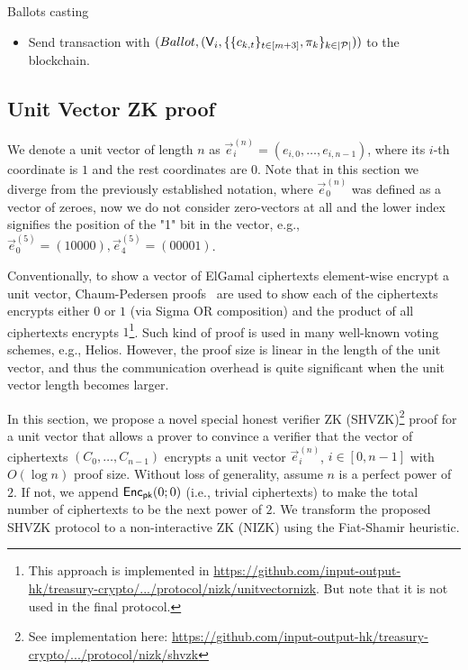 \begin{boxfig}{\label{fig:vote}Ballots casting}{}
\begin{itemize}
\begin{itemize}
\begin{itemize}
			    \item pick randomness $r_{k,1},\ldots, r_{k,m+3}\leftarrow \ZZ_q$ and compute $u_{k,t}\leftarrow \Enc_{\pk}(e^{(m+3)}_{k,t}; r_{k,t})$, $t\in[m+3]$;
			    \item produce a unit vector proof $\pi_k$ showing that $\{c_{k,t}\}_{t\in[m+3]}$ encrypts a unit vector.
			\end{itemize}
			  
			\item Send transaction with $(Ballot, (\mathsf{V}_i, \{\{c_{k,t}\}_{t\in[m+3]}, \pi_k\}_{k \in |\mathcal{P}|}))$ to the blockchain.
		\end{itemize}	
	\end{itemize}
\end{boxfig}

\subsection{Unit Vector ZK proof}\label{sec:SHVZK}
We denote a unit vector of length $n$ as $\vec{e}_i^{(n)} = (e_{i,0},\ldots, e_{i,n-1})$,  where its $i$-th coordinate is $1$ and the rest coordinates are $0$. Note that in this section we diverge from the previously established notation, where $\vec{e}_0^{(n)}$ was defined as a vector of zeroes, now we do not consider zero-vectors at all and the lower index signifies the position of the "1" bit in the vector, e.g., $\vec{e}_0^{(5)}=(10000), \vec{e}_4^{(5)}=(00001)$.

Conventionally, to show a vector of ElGamal ciphertexts element-wise encrypt a unit vector, Chaum-Pedersen proofs~\cite{CP92} are used to show each of the ciphertexts encrypts either $0$ or $1$ (via Sigma OR composition) and the product of all ciphertexts encrypts $1$\footnote{This approach is implemented in \href{https://github.com/input-output-hk/treasury-crypto/tree/master/src/main/scala/io/iohk/protocol/nizk/unitvectornizk}{https://github.com/input-output-hk/treasury-crypto/.../protocol/nizk/unitvectornizk}. But note that it is not used in the final protocol.}. Such kind of proof is used in many well-known voting schemes, e.g., Helios. However, the proof size is linear in the length of the unit vector, and thus the communication overhead is quite significant when the unit vector length becomes larger. 

In this section, we propose a novel special honest verifier ZK  (SHVZK)\footnote{See implementation here: \href{https://github.com/input-output-hk/treasury-crypto/tree/master/src/main/scala/io/iohk/protocol/nizk/shvzk}{https://github.com/input-output-hk/treasury-crypto/.../protocol/nizk/shvzk}} proof for a unit vector that allows a prover to convince a verifier that the vector of ciphertexts $(C_0,\ldots, C_{n-1})$ encrypts a unit vector $\vec{e}_i^{(n)}$, $i\in[0, n-1]$ with $O(\log n)$  proof size. Without loss of generality, assume $n$ is a perfect power of $2$. If not, we append $\mathsf{Enc}_{\mathsf{pk}}(0;0)$ (i.e., trivial ciphertexts) to make the total number of ciphertexts to be the next power of $2$. We transform the proposed SHVZK protocol to a non-interactive ZK (NIZK) using the Fiat-Shamir heuristic.


